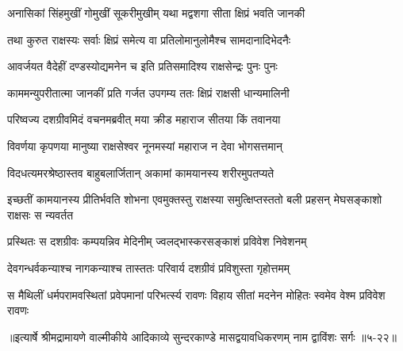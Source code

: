 \twolineshloka
{अनासिकां सिंहमुखीं गोमुखीं सूकरीमुखीम्}
{यथा मद्वशगा सीता क्षिप्रं भवति जानकी} %

\twolineshloka
{तथा कुरुत राक्षस्यः सर्वाः क्षिप्रं समेत्य वा}
{प्रतिलोमानुलोमैश्च सामदानादिभेदनैः} %

\twolineshloka
{आवर्जयत वैदेहीं दण्डस्योद्यमनेन च}
{इति प्रतिसमादिश्य राक्षसेन्द्रः पुनः पुनः} %

\twolineshloka
{काममन्युपरीतात्मा जानकीं प्रति गर्जत}
{उपगम्य ततः क्षिप्रं राक्षसी धान्यमालिनी} %

\twolineshloka
{परिष्वज्य दशग्रीवमिदं वचनमब्रवीत्}
{मया क्रीड महाराज सीतया किं तवानया} %

\twolineshloka
{विवर्णया कृपणया मानुष्या राक्षसेश्वर}
{नूनमस्यां महाराज न देवा भोगसत्तमान्} %

\twolineshloka
{विदधत्यमरश्रेष्ठास्तव बाहुबलार्जितान्}
{अकामां कामयानस्य शरीरमुपतप्यते} %

\threelineshloka
{इच्छतीं कामयानस्य प्रीतिर्भवति शोभना}
{एवमुक्तस्तु राक्षस्या समुत्क्षिप्तस्ततो बली}
{प्रहसन् मेघसङ्काशो राक्षसः स न्यवर्तत} %

\twolineshloka
{प्रस्थितः स दशग्रीवः कम्पयन्निव मेदिनीम्}
{ज्वलद्भास्करसङ्काशं प्रविवेश निवेशनम्} %

\twolineshloka
{देवगन्धर्वकन्याश्च नागकन्याश्च तास्ततः}
{परिवार्य दशग्रीवं प्रविशुस्ता गृहोत्तमम्} %

\twolineshloka
{स मैथिलीं धर्मपरामवस्थितां प्रवेपमानां परिभर्त्स्य रावणः}
{विहाय सीतां मदनेन मोहितः स्वमेव वेश्म प्रविवेश रावणः} %


॥इत्यार्षे श्रीमद्रामायणे वाल्मीकीये आदिकाव्ये सुन्दरकाण्डे मासद्वयावधिकरणम् नाम द्वाविंशः सर्गः ॥५-२२॥
